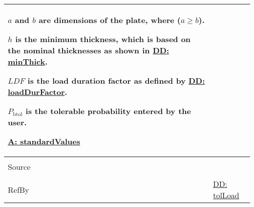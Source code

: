 \documentclass[12pt]{article}
\begin{document}
\begin{minipage}{\textwidth}
\begin{tabular}{>{\raggedright}p{}>{\raggedright\arraybackslash}p{}}
        $a$ and $b$ are dimensions of the plate, where ($a\geq{}b$).
        
        $h$ is the minimum thickness, which is based on the nominal thicknesses as shown in \hyperref[DD:minThick]{DD: minThick}.
        
        $LDF$ is the load duration factor as defined by \hyperref[DD:loadDurFactor]{DD: loadDurFactor}.
        
        ${P_{\text{b}\text{tol}}}$ is the tolerable probability entered by the user.
        
        \hyperref[assumpSV]{A: standardValues}
        
\\ \midrule \\
Source & \cite{astm2009}
         
\\ \midrule \\
RefBy & \hyperref[DD:tolLoad]{DD: tolLoad}
        
\\ \bottomrule
\end{tabular}
\end{minipage}
\end{document}
